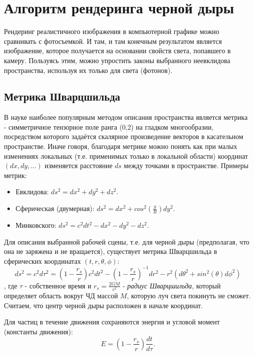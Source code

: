 \section{Алгоритм рендеринга черной дыры}
\label{sec:Chapter1} 

Рендеринг реалистичного изображения в компьютерной графике можно сравнивать с фотосъемкой. И там, и там конечным результатом является изображение, которое получается на основании свойств света, попавшего в камеру. Пользуясь этим, можно упростить законы выбранного неевклидова пространства, используя их только для света (фотонов).

\subsection{Метрика Шварцшильда}

В науке наиболее популярным методом описания пространства является метрика - симметричное тензорное поле ранга (0,2) на гладком многообразии, посредством которого задаётся скалярное произведение векторов в касательном пространстве. Иначе говоря, благодаря метрике можно понять как при малых изменениях локальных (т.е. применимых только в локальной области) координат $(dx, dy, ...)$ изменяется расстояние $ds$ между точками в пространстве. Примеры метрик:
\begin{itemize}
  \item Евклидова: $ds^2=dx^2+dy^2+dz^2$.
  \item Сферическая (двумерная): $ds^2=dx^2+cos^2(\frac{y}{R})dy^2$.
  \item Минковского: $ds^2=c^2dt^2-dx^2-dy^2-dz^2$.
\end{itemize}

Для описания выбранной рабочей сцены, т.е. для черной дыры (предполагая, что она не заряжена и не вращается), существует метрика Шварцшильда в сферических координатах $(t, r, \theta, \phi)$:
\begin{equation}
\label{eq:schwarzschild_metric}
    ds^2 = c^2d\tau^2 = (1-\frac{r_s}{r})c^{2}dt^{2} - (1-\frac{r_s}{r})^{-1}dr^2 - r^2(d\theta^2+sin^2(\theta)d\phi^2)
\end{equation}
, где $\tau$ - собственное время и $r_s = \frac{2GM}{c^2}$ - \textit{радиус Шварцшильда}, который определяет область вокруг ЧД массой $M$, которую луч света покинуть не сможет. Считаем, что центр черной дыры расположен в начале координат.

Для частиц в течение движения сохраняются энергия и угловой момент (константы движения):
\begin{equation}
\label{eq:motion_constant_E}
    E = (1-\frac{r_s}{r})\frac{dt}{d\tau}.
\end{equation}

